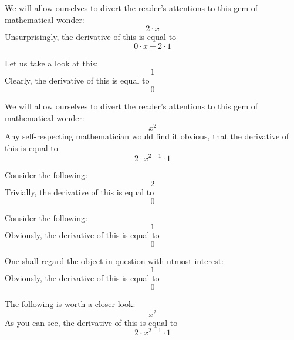 \documentclass{article}
\begin{document}
We will allow ourselves to divert the reader's attentions to this gem of mathematical wonder:
\begin{equation}
2 \cdot x 
\end{equation}
Unsurprisingly, the derivative of this is equal to
\begin{equation}
0 \cdot x + 2 \cdot 1 
\end{equation}

Let us take a look at this:
\begin{equation}
1 
\end{equation}
Clearly, the derivative of this is equal to
\begin{equation}
0 
\end{equation}

We will allow ourselves to divert the reader's attentions to this gem of mathematical wonder:
\begin{equation}
x ^{2 } 
\end{equation}
Any self-respecting mathematician would find it obvious, that the derivative of this is equal to
\begin{equation}
2 \cdot x ^{2 - 1 } \cdot 1 
\end{equation}

Consider the following:
\begin{equation}
2 
\end{equation}
Trivially, the derivative of this is equal to
\begin{equation}
0 
\end{equation}

Consider the following:
\begin{equation}
1 
\end{equation}
Obviously, the derivative of this is equal to
\begin{equation}
0 
\end{equation}

One shall regard the object in question with utmost interest:
\begin{equation}
1 
\end{equation}
Obviously, the derivative of this is equal to
\begin{equation}
0 
\end{equation}

The following is worth a closer look:
\begin{equation}
x ^{2 } 
\end{equation}
As you can see, the derivative of this is equal to
\begin{equation}
2 \cdot x ^{2 - 1 } \cdot 1 
\end{equation}
\end{document}
